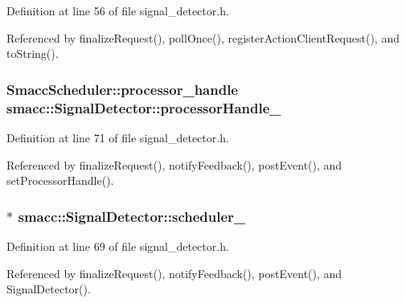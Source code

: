 Definition at line 56 of file signal\+\_\+detector.\+h.



Referenced by finalize\+Request(), poll\+Once(), register\+Action\+Client\+Request(), and to\+String().

\subsubsection[{\texorpdfstring{processor\+Handle\+\_\+}{processorHandle_}}]{\setlength{\rightskip}{0pt plus 5cm}Smacc\+Scheduler\+::processor\+\_\+handle smacc\+::\+Signal\+Detector\+::processor\+Handle\+\_\+\hspace{0.3cm}{\ttfamily [private]}}\hypertarget{classsmacc_1_1SignalDetector_ac5a7fe931a4cd3390219259c70533033}{}\label{classsmacc_1_1SignalDetector_ac5a7fe931a4cd3390219259c70533033}


Definition at line 71 of file signal\+\_\+detector.\+h.



Referenced by finalize\+Request(), notify\+Feedback(), post\+Event(), and set\+Processor\+Handle().

\subsubsection[{\texorpdfstring{scheduler\+\_\+}{scheduler_}}]{$\ast$ smacc\+::\+Signal\+Detector\+::scheduler\+\_\+\hspace{0.3cm}{\ttfamily [private]}}\hypertarget{classsmacc_1_1SignalDetector_acf16adb82241eb97efd07530dd16c80d}{}\label{classsmacc_1_1SignalDetector_acf16adb82241eb97efd07530dd16c80d}


Definition at line 69 of file signal\+\_\+detector.\+h.



Referenced by finalize\+Request(), notify\+Feedback(), post\+Event(), and Signal\+Detector().

